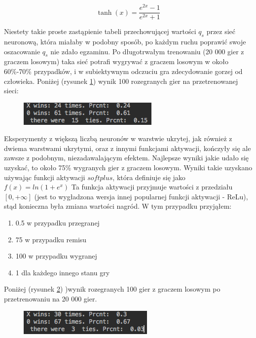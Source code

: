 \documentclass[licencjacka]{pracamgr}
\begin{document}
\begin{equation}
	\tanh(x) = \frac{e^{2x} - 1}{e^{2x} + 1}
\end{equation}

Niestety takie proste zastąpienie tabeli przechowującej wartości $q_{s}$ przez sieć neuronową, która miałaby w podobny sposób, po każdym ruchu poprawić swoje oszacowanie $q_{s}$ nie zdało egzaminu. Po długotrwałym trenowaniu (20 000 gier z graczem losowym) taka sieć potrafi wygrywać z graczem losowym w około 60\%-70\% przypadków, i w subiektywnym odczuciu gra zdecydowanie gorzej od człowieka.  Poniżej (rysunek \ref{Rys25}) wynik 100 rozegranych gier na przetrenowanej sieci:

\begin{figure}[h!]
	\includegraphics [scale=0.7]{nn_I_tanh.png}
	\caption{}
	\label{Rys25}
\end{figure}

Eksperymenty z większą liczbą neuronów w warstwie ukrytej, jak również z dwiema warstwami ukrytymi, oraz z innymi funkcjami aktywacji, kończyły się ale zawsze z podobnym, niezadawalającym efektem. Najlepsze wyniki jakie udało się uzyskać, to około 75\% wygranych gier z graczem losowym. Wyniki takie uzyskano używając funkcji aktywacji $softplus$, która definiuje się jako  $f(x) = ln(1+e^{x})$ Ta funkcja aktywacji przyjmuje wartości z przedziału $[0,+\infty]$  (jest to wygładzona wersja innej popularnej funkcji aktywacji -  ReLu), stąd konieczna była zmiana wartości nagród. W tym przypadku przyjąłem:

\begin{enumerate}
	\item{0.5 w przypadku przegranej}
	\item{75 w przypadku remisu }
	\item{100 w przypadku wygranej}
	\item{1 dla każdego innego stanu gry}
\end{enumerate}

Poniżej (rysunek \ref{Rys26}) )wynik rozegranych 100 gier z graczem losowym po przetrenowaniu na 20 000 gier.

\begin{figure}[h!]
	\includegraphics [scale=0.7]{nn_I_softplus.png}
	\caption{}
	\label{Rys26}
\end{figure}
\end{document}
